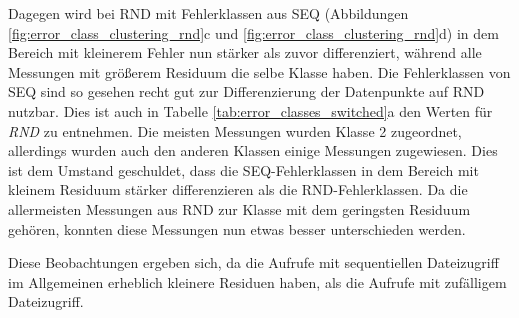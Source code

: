 \documentclass[
	12pt,
	a4paper,
	BCOR10mm,
	DIV14,
	listof=totoc,
	bibliography=totoc,
	headsepline
]{scrreprt}
\begin{document}
Dagegen wird bei RND mit Fehlerklassen aus SEQ (Abbildungen \ref{fig:error_class_clustering_rnd}c und \ref{fig:error_class_clustering_rnd}d) in dem Bereich mit kleinerem Fehler nun stärker als zuvor differenziert, während alle Messungen mit größerem Residuum die selbe Klasse haben.
Die Fehlerklassen von SEQ sind so gesehen recht gut zur Differenzierung der Datenpunkte auf RND nutzbar.
Dies ist auch in Tabelle \ref{tab:error_classes_switched}a den Werten für \textit{RND} zu entnehmen. Die meisten Messungen wurden Klasse 2 zugeordnet, allerdings wurden auch den anderen Klassen einige Messungen zugewiesen.
Dies ist dem Umstand geschuldet, dass die SEQ-Fehlerklassen in dem Bereich mit kleinem Residuum stärker differenzieren als die RND-Fehlerklassen.
Da die allermeisten Messungen aus RND zur Klasse mit dem geringsten Residuum gehören, konnten diese Messungen nun etwas besser unterschieden werden.\medskip

Diese Beobachtungen ergeben sich, da die Aufrufe mit sequentiellen Dateizugriff im Allgemeinen erheblich kleinere Residuen haben, als die Aufrufe mit zufälligem Dateizugriff.
\end{document}
